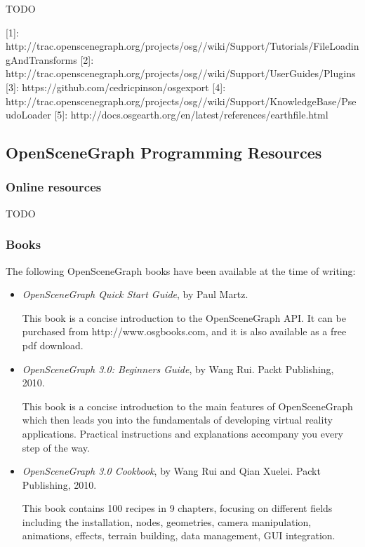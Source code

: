 TODO

[1]: http://trac.openscenegraph.org/projects/osg//wiki/Support/Tutorials/FileLoadingAndTransforms
[2]: http://trac.openscenegraph.org/projects/osg//wiki/Support/UserGuides/Plugins
[3]: https://github.com/cedricpinson/osgexport
[4]: http://trac.openscenegraph.org/projects/osg//wiki/Support/KnowledgeBase/PseudoLoader
[5]: http://docs.osgearth.org/en/latest/references/earthfile.html


\subsection{OpenSceneGraph Programming Resources}

\subsubsection{Online resources}

TODO

\subsubsection{Books}

The following OpenSceneGraph books have been available at the time of writing:

\begin{itemize}
\item \textit{OpenSceneGraph Quick Start Guide}, by Paul Martz.

This book is a concise introduction to the OpenSceneGraph API. It can be
purchased from http://www.osgbooks.com, and it is also available as
a free pdf download.

\item \textit{OpenSceneGraph 3.0: Beginners Guide}, by Wang Rui. Packt Publishing, 2010.

This book is a concise introduction to the main features of OpenSceneGraph
which then leads you into the fundamentals of developing virtual reality
applications. Practical instructions and explanations accompany you every
step of the way.

\item \textit{OpenSceneGraph 3.0 Cookbook}, by Wang Rui and Qian Xuelei. Packt Publishing, 2010.

This book contains 100 recipes in 9 chapters, focusing on different
fields including the installation, nodes, geometries, camera manipulation,
animations, effects, terrain building, data management, GUI integration.

\end{itemize}



